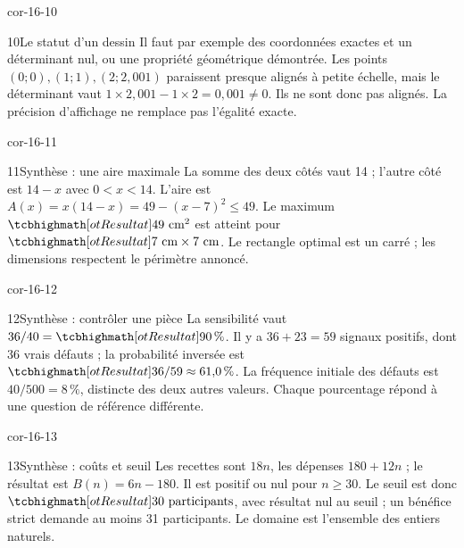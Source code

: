 \begin{blocLivre}{cor-16-10}
\begin{corrige}{10}{Le statut d’un dessin}
Il faut par exemple des coordonnées exactes et un déterminant nul, ou une propriété géométrique démontrée. Les points $(0;0),(1;1),(2;2{,}001)$ paraissent presque alignés à petite échelle, mais le déterminant vaut $1\times2{,}001-1\times2=0{,}001\ne0$. Ils ne sont donc pas alignés. La précision d’affichage ne remplace pas l’égalité exacte.
\end{corrige}
\end{blocLivre}
\begin{blocLivre}{cor-16-11}
\begin{corrige}{11}{Synthèse : une aire maximale}
La somme des deux côtés vaut 14 ; l’autre côté est $14-x$ avec $0<x<14$. L’aire est $A(x)=x(14-x)=49-(x-7)^2\le49$. Le maximum $\res{49\text{ cm}^2}$ est atteint pour $\res{7\text{ cm}\times7\text{ cm}}$. Le rectangle optimal est un carré ; les dimensions respectent le périmètre annoncé.
\label{fig-cor-16-11}
\end{corrige}
\end{blocLivre}
\begin{blocLivre}{cor-16-12}
\begin{corrige}{12}{Synthèse : contrôler une pièce}
La sensibilité vaut $36/40=\res{90\,\%}$. Il y a $36+23=59$ signaux positifs, dont 36 vrais défauts ; la probabilité inversée est $\res{36/59\approx61{,}0\,\%}$. La fréquence initiale des défauts est $40/500=8\,\%$, distincte des deux autres valeurs. Chaque pourcentage répond à une question de référence différente.
\end{corrige}
\end{blocLivre}
\begin{blocLivre}{cor-16-13}
\begin{corrige}{13}{Synthèse : coûts et seuil}
Les recettes sont $18n$, les dépenses $180+12n$ ; le résultat est $B(n)=6n-180$. Il est positif ou nul pour $n\ge30$. Le seuil est donc $\res{30\text{ participants}}$, avec résultat nul au seuil ; un bénéfice strict demande au moins 31 participants. Le domaine est l’ensemble des entiers naturels.
\end{corrige}
\end{blocLivre}
